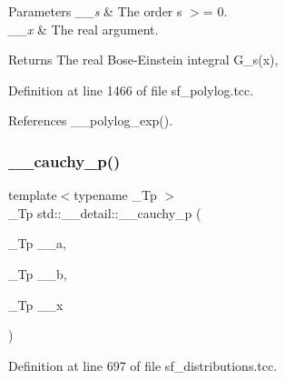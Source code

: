 \begin{DoxyParams}{Parameters}
{\em \+\_\+\+\_\+s} & The order s $>$= 0. \\
\hline
{\em \+\_\+\+\_\+x} & The real argument. \\
\hline
\end{DoxyParams}
\begin{DoxyReturn}{Returns}
The real Bose-\/\+Einstein integral G\+\_\+s(x), 
\end{DoxyReturn}


Definition at line 1466 of file sf\+\_\+polylog.\+tcc.



References \+\_\+\+\_\+polylog\+\_\+exp().

\mbox{\label{namespacestd_1_1____detail_ac92c91623b3e41c6384c977d5ec594e7}} 
\subsubsection{\texorpdfstring{\+\_\+\+\_\+cauchy\+\_\+p()}{\_\_cauchy\_p()}}
{\footnotesize\ttfamily template$<$typename \+\_\+\+Tp $>$ \\
\+\_\+\+Tp std\+::\+\_\+\+\_\+detail\+::\+\_\+\+\_\+cauchy\+\_\+p (\begin{DoxyParamCaption}\item[{\+\_\+\+Tp}]{\+\_\+\+\_\+a,  }\item[{\+\_\+\+Tp}]{\+\_\+\+\_\+b,  }\item[{\+\_\+\+Tp}]{\+\_\+\+\_\+x }\end{DoxyParamCaption})}



Definition at line 697 of file sf\+\_\+distributions.\+tcc.

\mbox{\label{namespacestd_1_1____detail_a5fa9d67b4e0af4e0e018a06d198f0280}} 
